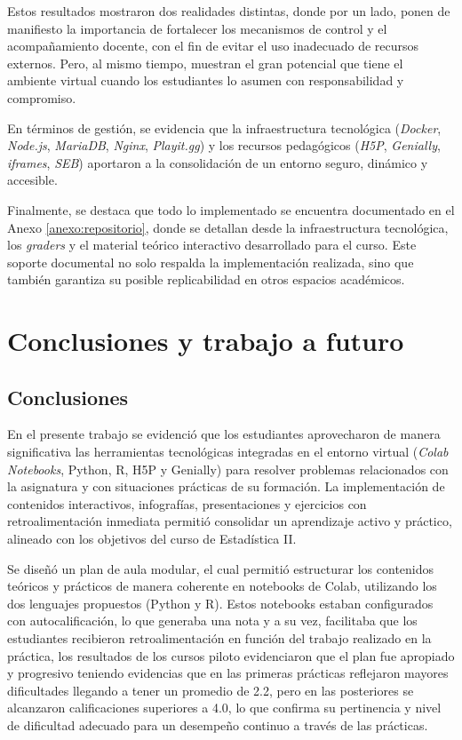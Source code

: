 \documentclass[letter,oneside,12pt,spanish]{report}
\begin{document}
Estos resultados mostraron dos realidades distintas, donde por un lado, ponen de manifiesto la importancia de fortalecer los mecanismos de control y el acompañamiento docente, con el fin de evitar el uso inadecuado de recursos externos. Pero, al mismo tiempo, muestran el gran potencial que tiene el ambiente virtual cuando los estudiantes lo asumen con responsabilidad y compromiso.

En términos de gestión, se evidencia que la infraestructura tecnológica (\textit{Docker}, \textit{Node.js}, \textit{MariaDB}, \textit{Nginx}, \textit{Playit.gg}) y los recursos pedagógicos (\textit{H5P}, \textit{Genially}, \textit{iframes}, \textit{SEB}) aportaron a la consolidación de un entorno seguro, dinámico y accesible.

Finalmente, se destaca que todo lo implementado se encuentra documentado en el Anexo \ref{anexo:repositorio}, donde se detallan desde la infraestructura tecnológica, los \textit{graders} y el material teórico interactivo desarrollado para el curso. Este soporte documental no solo respalda la implementación realizada, sino que también garantiza su posible replicabilidad en otros espacios académicos.


\newpage

\chapter{Conclusiones y trabajo a futuro}

\section{Conclusiones}

En el presente trabajo se evidenció que los estudiantes aprovecharon de manera significativa las herramientas tecnológicas integradas en el entorno virtual (\textit{Colab Notebooks}, Python, R, H5P y Genially) para resolver problemas relacionados con la asignatura y con situaciones prácticas de su formación. La implementación de contenidos interactivos, infografías, presentaciones y ejercicios con retroalimentación inmediata permitió consolidar un aprendizaje activo y práctico, alineado con los objetivos del curso de Estadística II.

Se diseñó un plan de aula modular, el cual permitió estructurar los contenidos teóricos y prácticos de manera coherente en notebooks de Colab, utilizando los dos lenguajes propuestos (Python y R). Estos notebooks estaban configurados con autocalificación, lo que generaba una nota y a su vez, facilitaba que los estudiantes recibieron retroalimentación en función del trabajo realizado en la práctica, los resultados de los cursos piloto evidenciaron que el plan fue apropiado y progresivo teniendo evidencias que en las primeras prácticas reflejaron mayores dificultades llegando a tener un promedio de 2.2, pero en las posteriores se alcanzaron calificaciones superiores a 4.0, lo que confirma su pertinencia y nivel de dificultad adecuado para un desempeño continuo a través de las prácticas.
\end{document}
